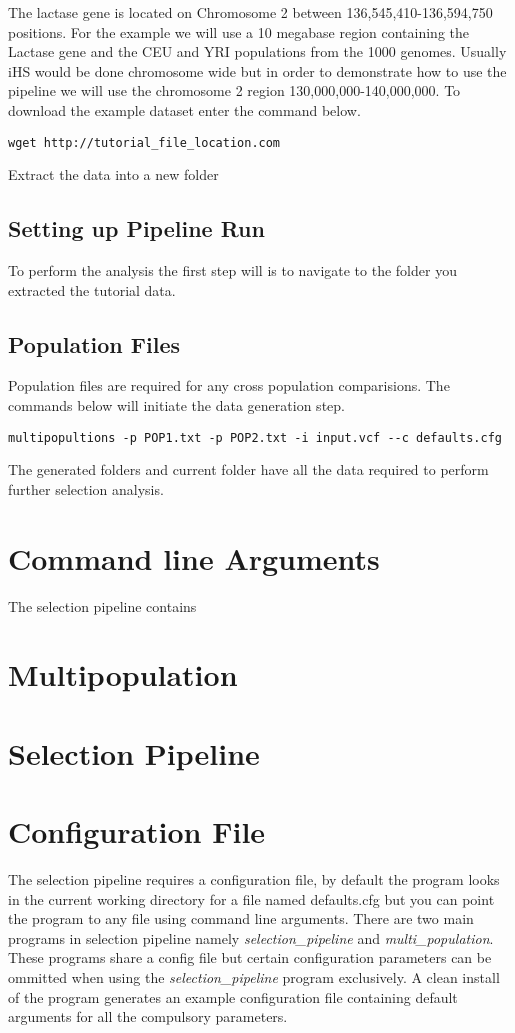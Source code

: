 \documentclass[a4paper,10pt]{article}
\begin{document}
The lactase gene is located on Chromosome 2 between 136,545,410-136,594,750 positions. For the example we will use a 10 megabase region containing the Lactase gene and the CEU and YRI populations from the 1000 genomes. Usually iHS would be done chromosome wide but in order to demonstrate how to use the pipeline we will use the chromosome 2 region 130,000,000-140,000,000. To download the example dataset enter the command below. 

\begin{verbatim}
wget http://tutorial_file_location.com 
\end{verbatim}

Extract the data into a new folder

\subsection{Setting up Pipeline Run}
To perform the analysis the first step will is to navigate to the folder you extracted the tutorial data.
\subsection{Population Files}
Population files are required for any cross population comparisions. The commands below will initiate the data generation step.
\begin{verbatim}
multipopultions -p POP1.txt -p POP2.txt -i input.vcf --c defaults.cfg
\end{verbatim}

The generated folders and current folder have all the data required to perform further selection analysis.

\section{Command line Arguments}
The selection pipeline contains
\section{Multipopulation}
\section{Selection Pipeline}

\section{Configuration File}
The selection pipeline requires a configuration file, by default the program looks in the current working directory for a file named defaults.cfg but you can point the program to any file using command line arguments. There are two main programs in selection pipeline namely \emph{selection\_pipeline} and \emph{multi\_population}. These programs share a config file but certain configuration parameters can be ommitted when using the \emph{selection\_pipeline} program exclusively. A clean install of the program generates an example configuration file containing default arguments for all the compulsory parameters.
\end{document}
